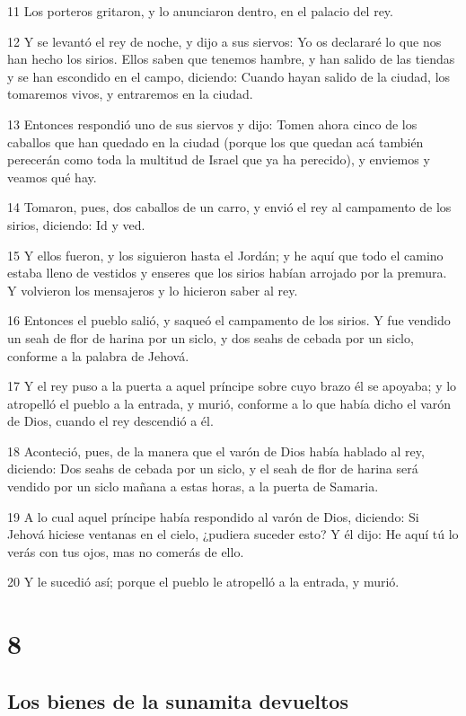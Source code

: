 \par 11 Los porteros gritaron, y lo anunciaron dentro, en el palacio del rey.
\par 12 Y se levantó el rey de noche, y dijo a sus siervos: Yo os declararé lo que nos han hecho los sirios. Ellos saben que tenemos hambre, y han salido de las tiendas y se han escondido en el campo, diciendo: Cuando hayan salido de la ciudad, los tomaremos vivos, y entraremos en la ciudad.
\par 13 Entonces respondió uno de sus siervos y dijo: Tomen ahora cinco de los caballos que han quedado en la ciudad (porque los que quedan acá también perecerán como toda la multitud de Israel que ya ha perecido), y enviemos y veamos qué hay.
\par 14 Tomaron, pues, dos caballos de un carro, y envió el rey al campamento de los sirios, diciendo: Id y ved.
\par 15 Y ellos fueron, y los siguieron hasta el Jordán; y he aquí que todo el camino estaba lleno de vestidos y enseres que los sirios habían arrojado por la premura. Y volvieron los mensajeros y lo hicieron saber al rey.
\par 16 Entonces el pueblo salió, y saqueó el campamento de los sirios. Y fue vendido un seah   de flor de harina por un siclo, y dos seahs de cebada por un siclo, conforme a la palabra de Jehová.
\par 17 Y el rey puso a la puerta a aquel príncipe sobre cuyo brazo él se apoyaba; y lo atropelló el pueblo a la entrada, y murió, conforme a lo que había dicho el varón de Dios, cuando el rey descendió a él.
\par 18 Aconteció, pues, de la manera que el varón de Dios había hablado al rey, diciendo: Dos seahs   de cebada por un siclo, y el seah de flor de harina será vendido por un siclo mañana a estas horas, a la puerta de Samaria.
\par 19 A lo cual aquel príncipe había respondido al varón de Dios, diciendo: Si Jehová hiciese ventanas en el cielo, ¿pudiera suceder esto? Y él dijo: He aquí tú lo verás con tus ojos, mas no comerás de ello. 
\par 20 Y le sucedió así; porque el pueblo le atropelló a la entrada, y murió.

\chapter{8}

\section*{Los bienes de la sunamita devueltos}


